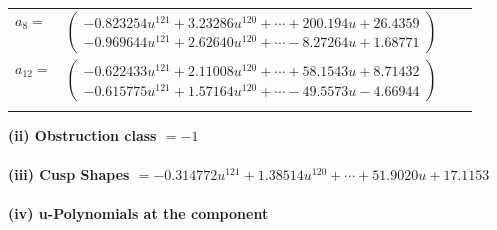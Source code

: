 \documentclass[1p]{elsarticle_modified}
\theoremstyle{definition}
\begin{document}
\begin{tabular}{m{7pt} m{180pt} m{7pt} m{180pt} }
\flushright $a_{8}=$&$\begin{pmatrix}-0.823254 u^{121}+3.23286 u^{120}+\cdots+200.194 u+26.4359\\-0.969644 u^{121}+2.62640 u^{120}+\cdots-8.27264 u+1.68771\end{pmatrix}$ \\
\flushright $a_{12}=$&$\begin{pmatrix}-0.622433 u^{121}+2.11008 u^{120}+\cdots+58.1543 u+8.71432\\-0.615775 u^{121}+1.57164 u^{120}+\cdots-49.5573 u-4.66944\end{pmatrix}$\\&\end{tabular}
\flushleft \textbf{(ii) Obstruction class $= -1$}\\~\\
\flushleft \textbf{(iii) Cusp Shapes $= -0.314772 u^{121}+1.38514 u^{120}+\cdots+51.9020 u+17.1153$}\\~\\
\newpage\renewcommand{\arraystretch}{1}
\flushleft \textbf{(iv) u-Polynomials at the component}\newline \\
\end{document}
